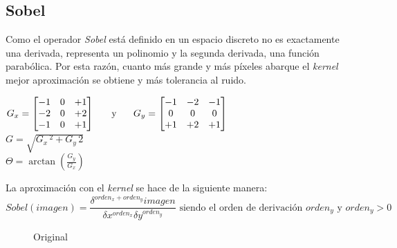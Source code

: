 \subsection{Sobel}
Como el operador \emph{Sobel} \emph{\citep*[History and definition of
  the sobel operator]{sobel2014history}} está definido en un espacio
discreto no es exactamente una derivada, representa un polinomio y la
segunda derivada, una función parabólica. Por esta razón, cuanto más
grande y más píxeles abarque el \emph{kernel} mejor aproximación se
obtiene y más tolerancia al ruido.
\begin{center}
  $ G_x = \begin{bmatrix}
    -1 & 0 & +1 \\
    -2 & 0 & +2 \\
    -1 & 0 & +1 \\
  \end{bmatrix}
  \hspace{0.5cm} \text{ y } \hspace{0.5cm} G_y = \begin{bmatrix}
    -1 & -2 & -1 \\
    0 & 0 & 0 \\
    +1 & +2 & +1 \\
  \end{bmatrix}
  $
  \\[0.5cm]
  $G = \sqrt{G_x\,^2 + G_y\,{2}}$
  \\[0.5cm]
  $\Theta= \arctan\left(\frac{G_y}{G_x} \right)$
\end{center}
La aproximación con el \emph{kernel} se hace de la siguiente manera:
\begin{equation*}
  Sobel(imagen) = \frac{\delta^{orden_x + orden_y} imagen}{\delta x^{orden_x} \delta
    y^{orden_y}} \text{ siendo el orden de derivación } orden_y \text{ y } orden_y > 0
\end{equation*}

\begin{figure}[H]
  \caption{Original}
  \centering \setlength\fboxsep{0pt} \setlength\fboxrule{0.5pt}
\end{figure}

